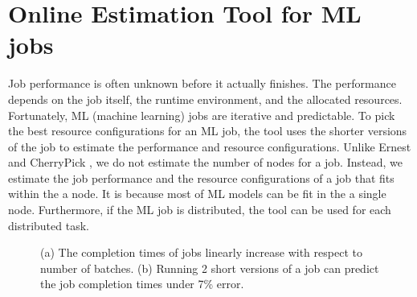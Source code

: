 \section{Online Estimation Tool for ML jobs}
\label{sec:res_estimation}


Job performance is often unknown before it actually finishes.
The performance depends on the job itself, the runtime environment, and the allocated resources.
Fortunately, ML (machine learning) jobs are iterative and predictable.
To pick the best resource configurations for an ML job, the tool uses the shorter versions of the job to estimate the performance and resource configurations.
Unlike Ernest \cite{ernest} and CherryPick \cite{cherrypick}, we do not estimate the number of nodes for a job.
Instead, we estimate the job performance and the resource configurations of a job that fits within the a node.
It is because most of ML models can be fit in the a single node. Furthermore, if the ML job is distributed, the tool can be used for each distributed task.

\begin{figure}[h]
	\centering
	    \hspace{0.0in}
	\caption{(a) The completion times of jobs linearly increase with respect to number of batches. (b) Running 2 short versions of a job can predict the job completion times under 7\% error.}
	\label{fig:est_compl_time}
\end{figure}




